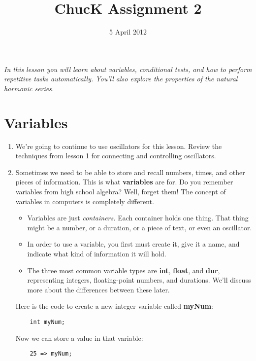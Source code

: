 \documentclass{article}
\title{ChucK Assignment 2}
\date{5 April 2012}
\begin{document}
\maketitle

\textsl{In this lesson you will learn about variables, conditional tests, and how to perform repetitive tasks automatically. You'll also explore the properties of the natural harmonic series.}\vspace{2mm}

\section{Variables}
\begin{enumerate}
\item We're going to continue to use oscillators for this lesson. Review the
techniques from lesson 1 for connecting and controlling oscillators.

\item Sometimes we need to be able to store and recall numbers, times, and
other pieces of information. This is what \textbf{variables} are for. Do you remember
variables from high school algebra? Well, forget them! The concept of
variables in computers is completely different.

\begin{itemize}
\item Variables are just \textsl{containers.} Each container holds one thing. That
thing might be a number, or a duration, or a piece of text, or even an oscillator.

\item In order to use a variable, you first must create it, give it a name, and
indicate what kind of information it will hold.

\item The three most common variable types are \textbf{int}, \textbf{float},
and \textbf{dur}, representing integers, floating-point numbers, and durations.
We'll discuss more about the differences between these later.
\end{itemize}

Here is the code to create a new integer variable called \textbf{myNum}:

\begin{lstlisting}
	int myNum;
\end{lstlisting}

Now we can store a value in that variable:

\begin{lstlisting}
	25 => myNum;
\end{lstlisting}


\end{enumerate}
\end{document}

